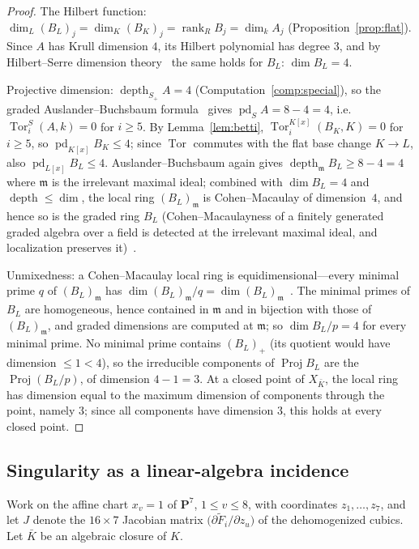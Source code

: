 \documentclass[11pt]{article}
\theoremstyle{definition}
\theoremstyle{remark}
\newcommand{\PP}{\mathbf P}
\newcommand{\Proj}{\operatorname{Proj}}
\newcommand{\Tor}{\operatorname{Tor}}
\newcommand{\depth}{\operatorname{depth}}
\newcommand{\pd}{\operatorname{pd}}
\begin{document}
\begin{proof}
The Hilbert function: $\dim_L(B_L)_j=\dim_K(B_K)_j
=\operatorname{rank}_RB_j=\dim_kA_j$ (Proposition~\ref{prop:flat}).  Since
$A$ has Krull dimension $4$, its Hilbert polynomial has degree $3$, and by
Hilbert--Serre dimension theory~\cite[Ch.~4]{BH} the same holds for $B_L$:
$\dim B_L=4$.

Projective dimension: $\depth_{S_+}A=4$ (Computation~\ref{comp:special}),
so the graded Auslander--Buchsbaum formula~\cite[\S1.3]{BH} gives
$\pd_SA=8-4=4$, i.e.\ $\Tor^S_i(A,k)=0$ for $i\geq5$.  By
Lemma~\ref{lem:betti}, $\Tor^{K[x]}_i(B_K,K)=0$ for $i\geq5$, so
$\pd_{K[x]}B_K\leq4$; since $\Tor$ commutes with the flat base change
$K\to L$, also $\pd_{L[x]}B_L\leq4$.  Auslander--Buchsbaum again gives
$\depth_{\mathfrak m}B_L\geq8-4=4$ where $\mathfrak m$ is the irrelevant
maximal ideal; combined with $\dim B_L=4$ and
$\depth\leq\dim$, the local ring $(B_L)_{\mathfrak m}$ is Cohen--Macaulay
of dimension~$4$, and hence so is the graded ring $B_L$ (Cohen--Macaulayness
of a finitely generated graded algebra over a field is detected at the
irrelevant maximal ideal, and localization preserves it)~\cite[\S2.1]{BH}.

Unmixedness: a Cohen--Macaulay local ring is equidimensional---every
minimal prime $q$ of $(B_L)_{\mathfrak m}$ has
$\dim(B_L)_{\mathfrak m}/q=\dim(B_L)_{\mathfrak m}$~\cite[\S2.1]{BH}.  The
minimal primes of $B_L$ are homogeneous, hence contained in
$\mathfrak m$ and in bijection with those of $(B_L)_{\mathfrak m}$, and
graded dimensions are computed at $\mathfrak m$; so $\dim B_L/p=4$ for
every minimal prime.  No minimal prime contains $(B_L)_+$ (its quotient
would have dimension $\leq1<4$), so the irreducible components of
$\Proj B_L$ are the $\Proj(B_L/p)$, of dimension $4-1=3$.  At a closed
point of $X_{\bar K}$, the local ring has dimension equal to the maximum
dimension of components through the point, namely $3$; since all components
have dimension $3$, this holds at every closed point.
\end{proof}

\subsection{Singularity as a linear-algebra incidence}

Work on the affine chart $x_v=1$ of $\PP^7$, $1\leq v\leq8$, with
coordinates $z_1,\ldots,z_7$, and let $J$ denote the $16\times7$ Jacobian
matrix $\bigl(\partial\widetilde F_i/\partial z_u\bigr)$ of the
dehomogenized cubics.  Let $\bar K$ be an algebraic closure of $K$.
\end{document}
